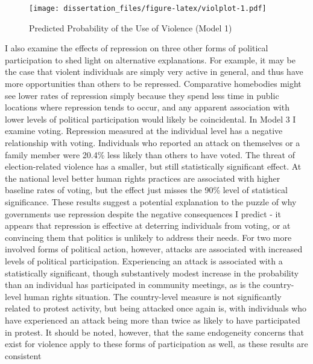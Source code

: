 \documentclass[12pt,]{book}
\theoremstyle{definition}
\theoremstyle{definition}
\theoremstyle{definition}
\theoremstyle{remark}
\begin{document}
\begin{figure}
\centering
\texttt{[image: dissertation\_files/figure-latex/violplot-1.pdf]}
\caption{\label{fig:violplot}Predicted Probability of the Use of Violence
(Model 1)}
\end{figure}

I also examine the effects of repression on three other forms of
political participation to shed light on alternative explanations. For
example, it may be the case that violent individuals are simply very
active in general, and thus have more opportunities than others to be
repressed. Comparative homebodies might see lower rates of repression
simply because they spend less time in public locations where repression
tends to occur, and any apparent association with lower levels of
political participation would likely be coincidental. In Model 3 I
examine voting. Repression measured at the individual level has a
negative relationship with voting. Individuals who reported an attack on
themselves or a family member were 20.4\% less likely than others to
have voted. The threat of election-related violence has a smaller, but
still statistically significant effect. At the national level better
human rights practices are associated with higher baseline rates of
voting, but the effect just misses the 90\% level of statistical
significance. These results suggest a potential explanation to the
puzzle of why governments use repression despite the negative
consequences I predict - it appears that repression is effective at
deterring individuals from voting, or at convincing them that politics
is unlikely to address their needs. For two more involved forms of
political action, however, attacks are associated with increased levels
of political participation. Experiencing an attack is associated with a
statistically significant, though substantively modest increase in the
probability than an individual has participated in community meetings,
as is the country-level human rights situation. The country-level
measure is not significantly related to protest activity, but being
attacked once again is, with individuals who have experienced an attack
being more than twice as likely to have participated in protest. It
should be noted, however, that the same endogeneity concerns that exist
for violence apply to these forms of participation as well, as these
results are consistent
\end{document}
